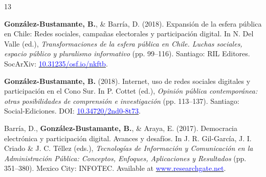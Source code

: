 \begin{publications}
\begin{benumerate}{13}
\item{{\bfseries González-Bustamante, B.}, \& Barría, D. (2018). Expansión de la esfera pública en Chile: Redes sociales, campañas electorales y participación digital. In N. Del Valle (ed.), {\itshape Transformaciones de la esfera pública en Chile. Luchas sociales, espacio público y pluralismo informativo} (pp. 99--116). Santiago: RIL Editores. SocArXiv: \href{https://doi.org/10.31235/osf.io/nkftb}{\textcolor{blue}{10.31235/osf.io/nkftb}}.}\vspace{1mm}


\item{{\bfseries González-Bustamante, B.} (2018). Internet, uso de redes sociales digitales y participación en el Cono Sur. In P. Cottet (ed.), {\itshape Opinión pública contemporánea: otras posibilidades de comprensión e investigación} (pp. 113--137). Santiago: Social-Ediciones. DOI: \href{https://doi.org/10.34720/2nd0-8t73}{\textcolor{blue}{10.34720/2nd0-8t73}}.}\vspace{1mm}


\item{Barría, D., {\bfseries González-Bustamante, B.}, \& Araya, E. (2017). Democracia electrónica y participación digital. Avances y desafíos. In J. R. Gil-García, J. I. Criado \&  J. C. Téllez (eds.), {\itshape Tecnologías de Información y Comunicación en la Administración P\'ublica: Conceptos, Enfoques, Aplicaciones y Resultados} (pp. 351--380). Mexico City: INFOTEC. Available at \href{https://www.researchgate.net/publication/321980289_Democracia_electronica_y_participacion_digital_Avances_y_desafios}{\textcolor{blue}{www.researchgate.net}}.}\vspace{1mm}


\end{benumerate}
\end{publications}
